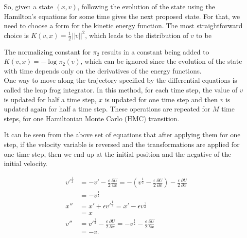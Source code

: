 \documentclass[letterpaper,english,10pt]{article}
\begin{document}
So, given a state $(x,v)$, following the evolution of the state using the Hamilton's equations for some time gives the next proposed state. For that, we need to choose a form for the kinetic energy function. The most straightforward choice is $K(v,x) = \frac{1}{2} ||v||^2$, which leads to the distribution of $v$ to be 


The normalizing constant for $\pi_2$ results in a constant being added to $K(v,x) = - \log \pi_2(v)$, which can be ignored since the evolution of the state with time depends only on the derivatives of the energy functions. \\

One way to move along the trajectory specified by the differential equations is called the leap frog integrator. In this method, for each time step, the value of $v$ is updated for half a time step, $x$ is updated for one time step and then $v$ is updated again for half a time step. These operations are repeated for $M$ time steps, for one  Hamiltonian Monte Carlo (HMC) transition.


It can be seen from the above set of equations that after applying them for one step, if the velocity variable is reversed and the transformations are applied for one time step, then we end up at the initial position and the negative of the initial velocity.

\begin{align*}
v'^{\frac{1}{2}} &= -v' - \frac{\epsilon}{2} \frac{\partial U}{\partial x} = - \left( v^{\frac{1}{2}} - \frac{\epsilon}{2} \frac{\partial U}{\partial x} \right) - \frac{\epsilon}{2} \frac{\partial U}{\partial x} \\
	&= - v^{\frac{1}{2}} \\
x'' &= x' + \epsilon v'^{\frac{1}{2}} = x' - \epsilon v^{\frac{1}{2}} \\
	&= x \\
v'' &= v'^{\frac{1}{2}} - \frac{\epsilon}{2} \frac{\partial U}{\partial x} = - v^{\frac{1}{2}} - \frac{\epsilon}{2} \frac{\partial U}{\partial x} \\
	&= - v.
\end{align*}
\end{document}
